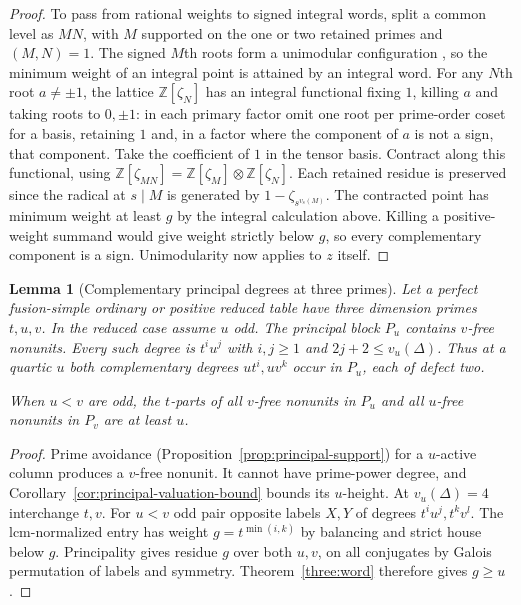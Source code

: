 \documentclass[11pt,a4paper]{article}
\numberwithin{equation}{section}
\newtheorem{lemma}[theorem]{Lemma}
\theoremstyle{remark}
\newcommand{\ZZ}{\mathbb Z}
\begin{document}
\begin{proof}
To pass from rational weights to signed integral words, split a common level as $MN$, with $M$ supported on the one or two retained primes and $(M,N)=1$. The signed $M$th roots form a unimodular configuration \cite[Theorems~3, 13]{BH}, so the minimum weight of an integral point is attained by an integral word. For any $N$th root $a\ne\pm1$, the lattice $\ZZ[\zeta_N]$ has an integral functional fixing $1$, killing $a$ and taking roots to $0,\pm1$: in each primary factor omit one root per prime-order coset for a basis, retaining $1$ and, in a factor where the component of $a$ is not a sign, that component. Take the coefficient of $1$ in the tensor basis. Contract along this functional, using $\ZZ[\zeta_{MN}]=\ZZ[\zeta_M]\otimes\ZZ[\zeta_N]$. Each retained residue is preserved since the radical at $s\mid M$ is generated by $1-\zeta_{s^{v_s(M)}}$. The contracted point has minimum weight at least $g$ by the integral calculation above. Killing a positive-weight summand would give weight strictly below $g$, so every complementary component is a sign. Unimodularity now applies to $z$ itself.
\end{proof}

\begin{lemma}[Complementary principal degrees at three primes]\label{three:complementary}
Let a perfect fusion-simple ordinary or positive reduced table have
three dimension primes $t,u,v$. In the reduced case assume $u$ odd.
The principal block $P_u$ contains $v$-free nonunits. Every such
degree is $t^iu^j$ with $i,j\ge1$ and
$2j+2\le v_u(\Delta)$. Thus at a quartic $u$ both complementary
degrees $ut^i,uv^k$ occur in $P_u$, each of defect two.

When $u<v$ are odd, the $t$-parts of all $v$-free nonunits in $P_u$
and all $u$-free nonunits in $P_v$ are at least $u$.
\end{lemma}
\begin{proof}
Prime avoidance (Proposition~\ref{prop:principal-support}) for a
$u$-active column produces a $v$-free nonunit. It cannot have
prime-power degree, and Corollary~\ref{cor:principal-valuation-bound}
bounds its $u$-height. At $v_u(\Delta)=4$ interchange $t,v$.
For $u<v$ odd pair opposite labels $X,Y$ of degrees
$t^iu^j,t^kv^l$. The lcm-normalized entry has weight
$g=t^{\min(i,k)}$ by balancing and strict house below $g$.
Principality gives residue $g$ over both $u,v$, on all conjugates
by Galois permutation of labels and symmetry. Theorem~\ref{three:word}
therefore gives $g\ge u$.
\end{proof}
\end{document}

